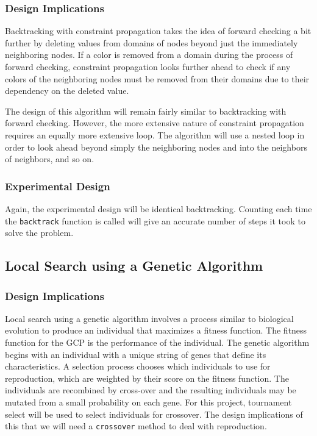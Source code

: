 \documentclass{article}
\begin{document}
\begin{multicols}{2}
\subsubsection{Design Implications}
Backtracking with constraint propagation takes the idea of forward checking a bit further by deleting values from domains of nodes beyond just the immediately neighboring nodes.  If a color is removed from a domain during the process of forward checking, constraint propagation looks further ahead to check if any colors of the neighboring nodes must be removed from their domains due to their dependency on the deleted value. \par
The design of this algorithm will remain fairly similar to backtracking with forward checking.  However, the more extensive nature of constraint propagation requires an equally more extensive loop.  The algorithm will use a nested loop in order to look ahead beyond simply the neighboring nodes and into the neighbors of neighbors, and so on. \par
\subsubsection{Experimental Design}
Again, the experimental design will be identical backtracking. Counting each time the \texttt{backtrack} function is called will give an accurate number of steps it took to solve the problem.

\subsection{Local Search using a Genetic Algorithm}
\subsubsection{Design Implications}
Local search using a genetic algorithm involves a process similar to biological evolution to produce an individual that maximizes a fitness function.  The fitness function for the GCP is the performance of the individual.  The genetic algorithm begins with an individual with a unique string of genes that define its characteristics.  A selection process chooses which individuals to use for reproduction, which are weighted by their score on the fitness function.  The individuals are recombined by cross-over and the resulting individuals may be mutated from a small probability on each gene. For this project, tournament select will be used to select individuals for crossover. The design implications of this that we will need a \texttt{crossover} method to deal with reproduction.

\end{multicols}
\end{document}
